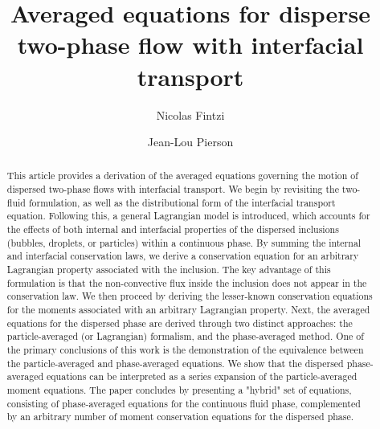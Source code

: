 \documentclass[11pt]{My_preprint}
\title{Averaged equations for disperse two-phase flow with interfacial transport}
\author[1,2]{Nicolas Fintzi}
\author[1]{Jean-Lou Pierson}
\affil[1]{IFP Energies Nouvelles, Rond-point de l'echangeur de Solaize, 69360 Solaize}
\affil[2]{Sorbonne Université, Institut Jean le Rond $\partial$'Alembert, 4 place Jussieu, 75252 PARIS CEDEX 05, France}
\begin{document}
\maketitle

\begin{abstract}
This article provides a derivation of the averaged equations governing the motion of dispersed two-phase flows with interfacial transport. 
We begin by revisiting the two-fluid formulation, as well as the distributional form of the interfacial transport equation. 
Following this, a general Lagrangian model is introduced, which accounts for the effects of both internal and interfacial properties of the dispersed inclusions (bubbles, droplets, or particles) within a continuous phase.
By summing the internal and interfacial conservation laws, we derive a conservation equation for an arbitrary Lagrangian property associated with the inclusion. 
The key advantage of this formulation is that the non-convective flux inside the inclusion does not appear in the conservation law. 
We then proceed by deriving the lesser-known conservation equations for the moments associated with an arbitrary Lagrangian property.  
Next, the averaged equations for the dispersed phase are derived through two distinct approaches: the particle-averaged (or Lagrangian) formalism, and the phase-averaged method. 
One of the primary conclusions of this work is the demonstration of the equivalence between the particle-averaged and phase-averaged equations. 
We show that the dispersed phase-averaged equations can be interpreted as a series expansion of the particle-averaged moment equations. 
The paper concludes by presenting a "hybrid" set of equations, consisting of phase-averaged equations for the continuous fluid phase, complemented by an arbitrary number of moment conservation equations for the dispersed phase.

\end{abstract}
\end{document}
